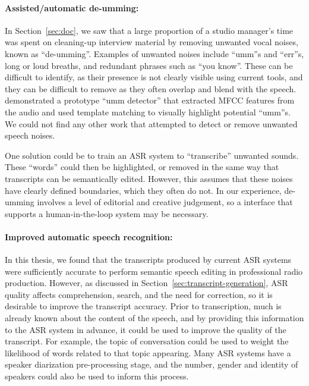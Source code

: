 \paragraph{Assisted/automatic de-umming:}

In Section~\ref{sec:doc}, we saw that a large proportion of a studio manager's time was spent on cleaning-up interview
material by removing unwanted vocal noises, known as ``de-umming''. Examples of unwanted noises include ``umm''s and
``err''s, long or loud breaths, and redundant phrases such as ``you know''.  These can be difficult to identify, as
their presence is not clearly visible using current tools, and they can be difficult to remove as they often overlap
and blend with the speech. \citet{Loviscach2013} demonstrated a prototype ``umm detector'' that extracted MFCC
\citep{Imai1983} features from the audio and used template matching to visually highlight potential ``umm''s. We could
not find any other work that attempted to detect or remove unwanted speech noises.

One solution could be to train an
ASR system to ``transcribe'' unwanted sounds. These ``words'' could then be highlighted, or removed in the same way
that transcripts can be semantically edited.  However, this assumes that these noises have clearly defined boundaries,
which they often do not.  In our experience, de-umming involves a level of editorial and creative judgement, so a
interface that supports a human-in-the-loop system may be necessary.

\paragraph{Improved automatic speech recognition:}

In this thesis, we found that the transcripts produced by current ASR systems were sufficiently accurate to perform
semantic speech editing in professional radio production. However, as discussed in
Section~\ref{sec:transcript-generation}, ASR quality affects comprehension, search, and the need for correction, so it
is desirable to improve the transcript accuracy. Prior to transcription, much is already known about the content of the
speech, and by providing this information to the ASR system in advance, it could be used to improve the quality of the
transcript.  For example, the topic of conversation could be used to weight the likelihood of words related to that
topic appearing.  Many ASR systems have a speaker diarization pre-processing stage, and the number, gender and identity
of speakers could also be used to inform this process.

